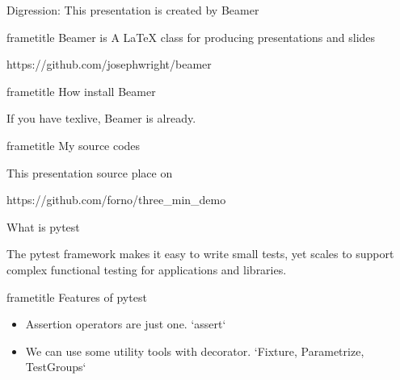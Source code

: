 \begin{frame}[plain]
  {Digression: This presentation is created by Beamer}

  \begin{beamercolorbox}[rounded=true, center, shadow=true,wd=\linewidth]{frametitle}
    Beamer is A LaTeX class for producing presentations and slides
  \end{beamercolorbox}
  https://github.com/josephwright/beamer

  \begin{beamercolorbox}[rounded=true, center, shadow=true,wd=\linewidth]{frametitle}
    How install Beamer
  \end{beamercolorbox}
  If you have texlive, Beamer is already.

  \begin{beamercolorbox}[rounded=true, center, shadow=true,wd=\linewidth]{frametitle}
    My source codes
  \end{beamercolorbox}

  This presentation source place on
  
  https://github.com/forno/three\_min\_demo
\end{frame}

\begin{frame}[plain]
  {What is pytest}

  The pytest framework makes it easy to write small tests,
  yet scales to support complex functional testing for applications and libraries.

  \begin{beamercolorbox}[rounded=true, center, shadow=true,wd=\linewidth]{frametitle}
    {Features of pytest}
  \end{beamercolorbox}

  \begin{itemize}
    \item Assertion operators are just one. `assert`
    \item We can use some utility tools with decorator. `Fixture, Parametrize, TestGroups`
  \end{itemize}
\end{frame}

